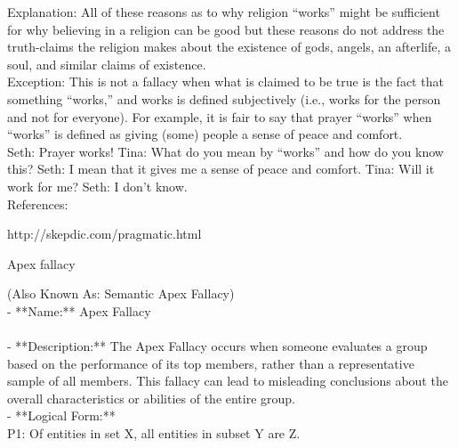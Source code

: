 \documentclass[a4paper,12pt,single,pdftex]{scrbook}
\begin{document}
{    
      Explanation: All of these reasons as to why religion “works” might be sufficient for why believing in a religion can be good  but these reasons do not address the truth-claims the religion makes about the existence of gods, angels, an afterlife, a soul, and similar claims of existence.
    \\

    
      Exception: This is not a fallacy when what is claimed to be true is the fact that something “works,” and works is defined subjectively (i.e., works for the person and not for everyone). For example, it is fair to say that prayer “works” when “works” is defined as giving (some) people a sense of peace and comfort.
    \\

    
      Seth: Prayer works! \newline
Tina: What do you mean by “works” and how do you know this? \newline
Seth: I mean that it gives me a sense of peace and comfort. \newline
Tina: Will it work for me? \newline
Seth: I don’t know.
    \\

    References:

    
      http://skepdic.com/pragmatic.html
    
  }


Apex fallacy
    
      (Also Known As: Semantic Apex Fallacy)
    \\

  
    
      - **Name:** Apex Fallacy
    \\

    
      
    \\

    
      - **Description:** The Apex Fallacy occurs when someone evaluates a group based on the performance of its top members, rather than a representative sample of all members. This fallacy can lead to misleading conclusions about the overall characteristics or abilities of the entire group.
    \\

    
      - **Logical Form:**
    \\

    
      P1: Of entities in set X, all entities in subset Y are Z.
    \\
\end{document}

